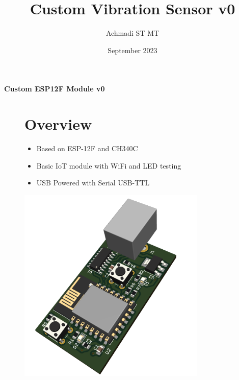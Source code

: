 \documentclass[a4paper,12pt,oneside,pdflatex,italian,final,twocolumn]{article}
\title{Custom Vibration Sensor v0}
\author{Achmadi ST MT}
\date{September 2023}
\begin{document}
	\pagestyle{fancy}
	
	\chead{\today}
	
	\onecolumn
	\begin{figure}
		
	\end{figure}\begin{minipage}{0.47\textwidth}
		\centering
		
	\end{minipage}
	\hfill
	\begin{minipage}{0.47\textwidth}
		\raggedleft
		\Huge \textbf{Custom ESP12F Module v0}
	\end{minipage}

\begin{figure}
	\begin{minipage}{0.47\textwidth}
		
		\section{Overview}
		\begin{itemize}
			\item Based on ESP-12F and CH340C
			\item Basic IoT module with WiFi and LED testing
			\item USB Powered with Serial USB-TTL
		\end{itemize}
		
		\end{minipage}
		\hfill
		\begin{minipage}{0.47\textwidth}
			\centering
			\includegraphics[width=0.8\textwidth,right]{images/perspective.png}
		\end{minipage}
	\end{figure}
\end{document}
